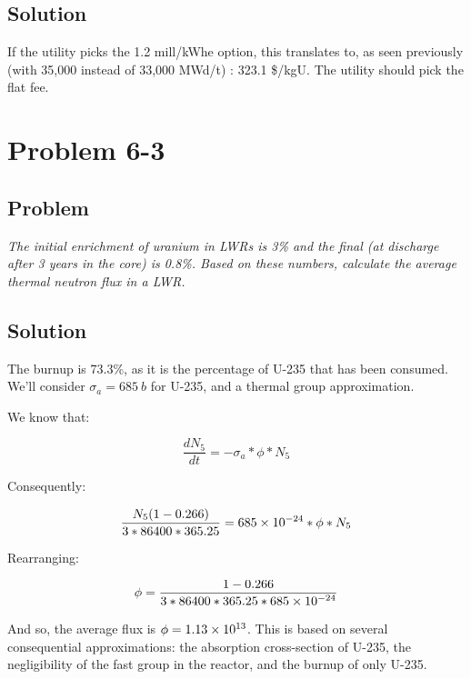 \subsection{Solution}

If the utility picks the 1.2 mill/kWhe option, this translates to, as seen previously (with 35,000 instead of 33,000 MWd/t) : 323.1 \$/kgU. The utility should pick the flat fee.



\section{Problem 6-3}
\label{prob63}


\subsection{Problem}
\textit{The initial enrichment of uranium in LWRs is 3\% and the final (at discharge after 3 years in the core) is 0.8\%. Based on these numbers, calculate the average thermal neutron flux in a LWR.}

\subsection{Solution}

The burnup is 73.3\%, as it is the percentage of U-235 that has been consumed. We'll consider $\sigma_a = 685\ b$ for U-235, and a thermal group approximation.

We know that:

\begin{equation}
\frac{dN_5}{dt} = -\sigma_a * \phi * N_5
\end{equation}

Consequently:

\begin{equation}
\frac{N_5(1-0.266)}{3 * 86400 * 365.25} = \text{\num{685e-24}} * \phi * N_5
\end{equation}

Rearranging:


\begin{equation}
\phi = \frac{1-0.266}{3 * 86400 * 365.25 * \text{\num{685e-24}}}
\end{equation}

And so, the average flux is $\phi = \text{\num{1.13e13}}$. This is based on several consequential approximations: the absorption cross-section of U-235, the negligibility of the fast group in the reactor, and the burnup of only U-235.

